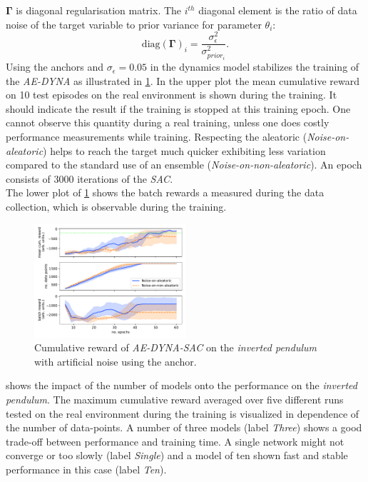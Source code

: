 \documentclass[
reprint,
amsmath,amssymb,amsfonts,clevref,
aps,
prstab,
]{revtex4-2}
\begin{document}
$\pmb{\Gamma}$ is diagonal regularisation matrix. The $i^{th}$ diagonal element is the ratio of data noise of the target variable to prior variance for parameter $\theta_i$:
\begin{equation}
	\label{eqn_anch_loss_init}
	\text{diag}(\pmb{\Gamma})_i = \frac{\sigma^2_\epsilon}{\sigma^2_{prior_i}}.
\end{equation}
Using the anchors and $\sigma_\epsilon=0.05$ in the dynamics model stabilizes the training of the \emph{AE-DYNA} as illustrated in \cref{fig:comparsion_noise_ae_dyna}. In the upper plot the mean cumulative reward on 10 test episodes on the real environment is shown during the training. It should indicate the result if the training is stopped at this training epoch. One cannot observe this quantity during a real training, unless one does costly performance measurements while training. Respecting the aleatoric (\emph{Noise-on-aleatoric}) helps to reach the target much quicker exhibiting less variation compared to the standard use of an ensemble (\emph{Noise-on-non-aleatoric}). An epoch consists of 3000 iterations of the \emph{SAC}.\\
The lower plot of \cref{fig:comparsion_noise_ae_dyna} shows the batch rewards a measured during the data collection, which is observable during the training.
\begin{figure}
	\centering
	\includegraphics*[width=0.5\textwidth]{Figures/Comparison_noise_ae_dyna}
	\caption{Cumulative reward of \emph{AE-DYNA-SAC} on the \emph{inverted pendulum} with artificial noise using the anchor.}
	\label{fig:comparsion_noise_ae_dyna}
\end{figure}
 shows the impact of the number of models onto the performance on the \emph{inverted pendulum}. The maximum cumulative reward averaged over five different runs tested on the real environment during the training is visualized in dependence of the number of data-points. A number of three models (label \emph{Three}) shows a good trade-off between performance and training time. A single network might not converge or too slowly (label \emph{Single}) and a model of ten shown fast and stable performance in this case (label \emph{Ten}).
\end{document}
